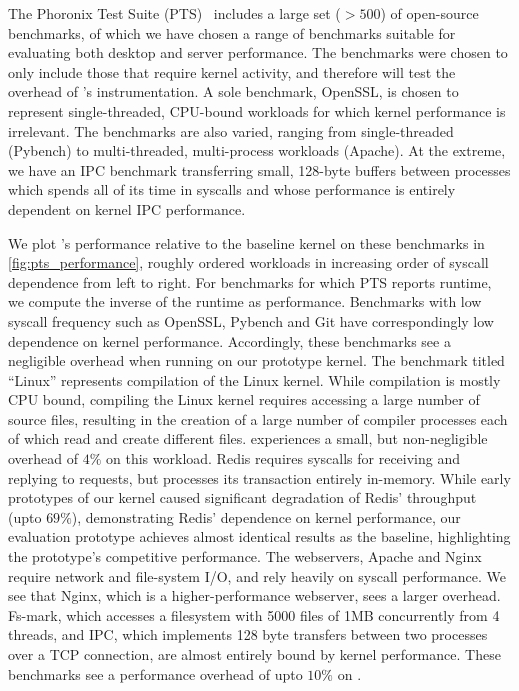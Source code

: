\documentclass[letterpaper,twocolumn,10pt, anonymous]{article}
\begin{document}
The Phoronix Test Suite (PTS)~\cite{pts} includes a large set ($>500$) of 
open-source benchmarks, of which we have chosen a range of benchmarks 
suitable for evaluating both desktop and server performance.
The benchmarks were chosen to only include those that require kernel 
activity, and therefore will test the overhead of \tiktok's instrumentation.
A sole benchmark, OpenSSL, is chosen to represent single-threaded, 
CPU-bound workloads for which kernel performance is irrelevant.
The benchmarks are also varied, ranging from single-threaded (Pybench) to 
multi-threaded, multi-process workloads (Apache).
At the extreme, we have an IPC benchmark transferring small, 128-byte 
buffers between processes which spends all of its time in syscalls
and whose performance is entirely dependent on kernel IPC performance.

We plot \tiktok's performance relative to the baseline kernel on
these benchmarks in \autoref{fig:pts_performance}, roughly ordered 
workloads in increasing order of syscall dependence from left to right.
For benchmarks for which PTS reports runtime, we compute the inverse 
of the runtime as performance.
Benchmarks with low syscall frequency such as OpenSSL, 
Pybench and Git have correspondingly low dependence on kernel performance.
Accordingly, these benchmarks see a negligible overhead when running 
on our prototype kernel.
The benchmark titled ``Linux'' represents compilation of the Linux kernel.
While compilation is mostly CPU bound, compiling the Linux kernel requires 
accessing a large number of source files, resulting in the creation 
of a large number of compiler processes each of which read and create 
different files. 
\tiktok experiences a small, but non-negligible overhead of $4\%$ on this workload.
Redis requires syscalls for receiving and replying to requests, but 
processes its transaction entirely in-memory. 
While early prototypes of our kernel caused significant degradation
of Redis' throughput (upto $69\%$), demonstrating Redis' dependence 
on kernel performance, 
our evaluation prototype achieves almost identical results as the baseline, 
highlighting the prototype's competitive performance.
The webservers, Apache and Nginx require network and file-system I/O, 
and rely heavily on syscall performance. 
We see that Nginx, which is a higher-performance webserver, sees a larger
overhead.
Fs-mark, which accesses a filesystem with 5000 files of 1MB concurrently
from 4 threads, and IPC, which implements 128 byte transfers between 
two processes over a TCP connection, are almost entirely bound by kernel 
performance. 
These benchmarks see a performance overhead of upto $10\%$ on \tiktok.
\end{document}
